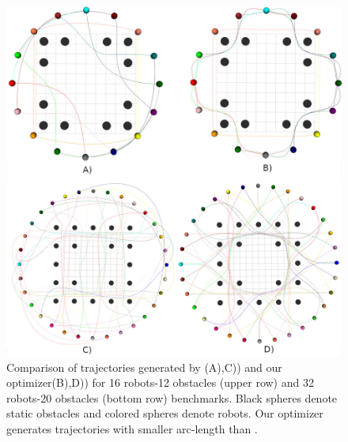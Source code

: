 \begin{figure}
    \centering
    \includegraphics{figures/gpu_mat/qualitative_benchmark.jpg}
    \caption[Qualitative Benchmark against Multi-Robot State-of-the-Art]{Comparison of trajectories generated by \citep{park2020efficient}(A),C)) and our optimizer(B),D)) for 16 robots-12 obstacles (upper row) and 32 robots-20 obstacles (bottom row) benchmarks. Black spheres denote static obstacles and colored spheres denote robots. Our optimizer generates trajectories with smaller arc-length than \citep{park2020efficient}.}
    \label{figure6}
\end{figure}


